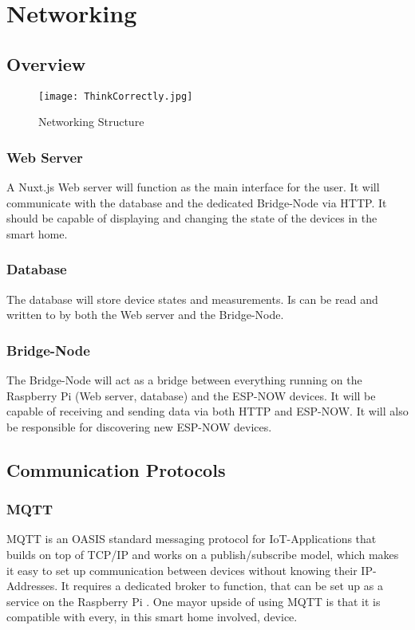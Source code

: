 \chapter{Networking}

\section{Overview}

\begin{figure}[H]
    \centering
    \texttt{[image: ThinkCorrectly.jpg]}
    \caption{Networking Structure}
\end{figure}
    \subsection{Web Server}
    A Nuxt.js Web server will function as the main interface
    for the user. It will communicate with the database and the
    dedicated Bridge-Node via HTTP. It should be capable of displaying
    and changing the state of the devices in the smart home.
    \subsection{Database}
    The database will store device states and measurements.
    Is can be read and written to by both the Web server and the
    Bridge-Node. 
    \subsection{Bridge-Node}
    The Bridge-Node will act as a bridge between everything running
    on the Raspberry Pi (Web server, database) and the ESP-NOW devices.
    It will be capable of receiving and sending data via both HTTP and
    ESP-NOW. It will also be responsible for discovering new ESP-NOW
    devices.

\section{Communication Protocols}
    \subsection{MQTT}
    MQTT is an OASIS standard messaging protocol for 
    IoT-Applications that builds on top of TCP/IP and 
    works on a publish/subscribe model, which makes it easy
    to set up communication between devices without knowing
    their IP-Addresses. It requires a dedicated broker to
    function, that can be set up as a service on the 
    Raspberry Pi \cite{mqtt_nodate}.
    One mayor upside of using MQTT is that it is compatible
    with every, in this smart home involved, device.



